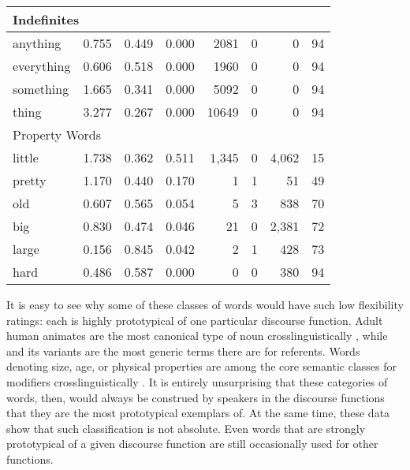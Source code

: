 \begin{table}
\begin{tabular}{ l r r r r r r r }
    \midrule
    \multicolumn{6}{l}{Indefinites}\\
    \midrule
    anything   & 0.755 & 0.449 & 0.000 & 2081  & 0 & 0 & 94\\
    everything & 0.606 & 0.518 & 0.000 & 1960  & 0 & 0 & 94\\
    something  & 1.665 & 0.341 & 0.000 & 5092  & 0 & 0 & 94\\
    thing      & 3.277 & 0.267 & 0.000 & 10649 & 0 & 0 & 94\\

    \midrule
    \multicolumn{6}{l}{Property Words}\\
    \midrule
    little & 1.738 & 0.362 & 0.511 & 1,345 & 0 & 4,062 & 15\\
    pretty & 1.170 & 0.440 & 0.170 &     1 & 1 &    51 & 49\\
    old    & 0.607 & 0.565 & 0.054 &     5 & 3 &   838 & 70\\
    big    & 0.830 & 0.474 & 0.046 &    21 & 0 & 2,381 & 72\\
    large  & 0.156 & 0.845 & 0.042 &     2 & 1 &   428 & 73\\
    hard   & 0.486 & 0.587 & 0.000 &     0 & 0 &   380 & 94\\

    \bottomrule
  \end{tabular}
\end{table}

It is easy to see why some of these classes of words would have such low flexibility ratings: each is highly prototypical of one particular discourse function. Adult human animates are the most canonical type of noun crosslinguistically , while  and its variants are the most generic terms there are for referents. Words denoting size, age, or physical properties are among the core semantic classes for modifiers crosslinguistically \parencite{Dixon1977}. It is entirely unsurprising that these categories of words, then, would always be construed by speakers in the discourse functions that they are the most prototypical exemplars of. At the same time, these data show that such classification is not absolute. Even words that are strongly prototypical of a given discourse function are still occasionally used for other functions.

